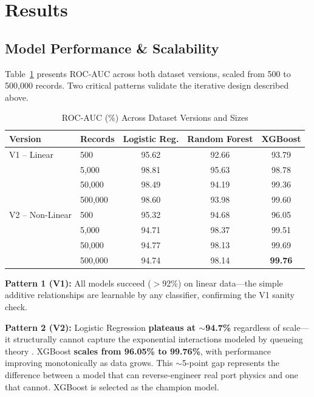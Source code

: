 \documentclass[11pt, a4paper]{article}
\begin{document}
\section{Results}

\subsection{Model Performance \& Scalability}

Table~\ref{tab:roc_auc} presents ROC-AUC across both dataset versions, scaled from 500 to 500,000 records. Two critical patterns validate the iterative design described above.

\begin{table}[h!]
\centering
\caption{ROC-AUC (\%) Across Dataset Versions and Sizes}
\label{tab:roc_auc}
\small
\begin{tabular}{llccc}
\toprule
\textbf{Version} & \textbf{Records} & \textbf{Logistic Reg.} & \textbf{Random Forest} & \textbf{XGBoost} \\
\midrule
V1 -- Linear    & 500       & 95.62 & 92.66 & 93.79 \\
               & 5,000     & 98.81 & 95.63 & 98.78 \\
               & 50,000    & 98.49 & 94.19 & 99.36 \\
               & 500,000   & 98.60 & 93.98 & 99.60 \\
\midrule
V2 -- Non-Linear & 500      & 95.32 & 94.68 & 96.05 \\
                & 5,000    & 94.71 & 98.37 & 99.51 \\
                & 50,000   & 94.77 & 98.13 & 99.69 \\
                & 500,000  & 94.74 & 98.14 & \textbf{99.76} \\
\bottomrule
\end{tabular}
\end{table}

\textbf{Pattern 1 (V1):} All models succeed ($>$92\%) on linear data---the simple additive relationships are learnable by any classifier, confirming the V1 sanity check.

\textbf{Pattern 2 (V2):} Logistic Regression \textbf{plateaus at $\sim$94.7\%} regardless of scale---it structurally cannot capture the exponential interactions modeled by queueing theory \cite{mm1_queue}. XGBoost \textbf{scales from 96.05\% to 99.76\%}, with performance improving monotonically as data grows. This $\sim$5-point gap represents the difference between a model that can reverse-engineer real port physics and one that cannot. XGBoost is selected as the champion model.
\end{document}
